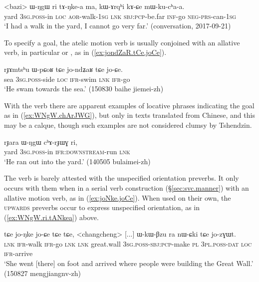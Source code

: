 \begin{exe}
\ex \label{ex:WNgW.ri.tANkea}
\gll <bazi> ɯ-ŋgɯ ri tɤ-ŋke-a ma, kɯ-ɤrqʰi kɤ-ɕe mɯ-ku-cʰa-a. \\
yard \textsc{3sg}.\textsc{poss}-in \textsc{loc} \textsc{aor}-walk-\textsc{1sg} \textsc{lnk} \textsc{sbj}:\textsc{pcp}-be.far \textsc{inf}-go \textsc{neg}-\textsc{prs}-can-\textsc{1sg} \\
\glt `I had a walk in the yard, I cannot go very far.' (conversation, 2017-09-21)
\end{exe}

To specify a goal, the atelic motion verb is usually conjoined with an allative verb, in particular  or , as in (\ref{ex:jondZaR.tCe.joCe}).

\begin{exe}
\ex \label{ex:jondZaR.tCe.joCe}
\gll rɟɤmtsʰu ɯ-pɕoʁ tɕe jo-ndʑaʁ tɕe jo-ɕe. \\
sea \textsc{3sg}.\textsc{poss}-side \textsc{loc} \textsc{ifr}-swim \textsc{lnk} \textsc{ifr}-go \\
\glt `He swam towards the sea.' (150830 baihe jiemei-zh)
\end{exe}

With the verb  there are apparent examples of locative phrases indicating the goal as in (\ref{ex:WNgW.chArJWG}), but only in texts translated from Chinese, and this may be a calque, though such examples are not considered clumsy by Tshendzin.

\begin{exe}
\ex \label{ex:WNgW.chArJWG}
\gll  rɟara ɯ-ŋgɯ cʰɤ-rɟɯɣ ri, \\
yard \textsc{3sg}.\textsc{poss}-in \textsc{ifr}:\textsc{downstream}-run \textsc{lnk} \\
\glt `He ran out into the yard.' (140505 bulaimei-zh) 
\end{exe} 

The verb  is barely attested with the unspecified orientation preverbs. It only occurs with them when in a serial verb construction (§\ref{sec:svc.manner}) with an allative motion verb, as in (\ref{ex:joNke.joCe}). When used on their own, the \textsc{upwards} preverbs occur to express unspecified orientation, as in (\ref{ex:WNgW.ri.tANkea}) above.

\begin{exe}
\ex \label{ex:joNke.joCe}
\gll tɕe jo-ŋke jo-ɕe tɕe tɕe, <changcheng> [...] ɯ-kɯ-βzu ra nɯ-ɕki tɕe jo-zɣɯt. \\
\textsc{lnk} \textsc{ifr}-walk \textsc{ifr}-go \textsc{lnk} \textsc{lnk} great.wall {  } \textsc{3sg}.\textsc{poss}-\textsc{sbj}:\textsc{pcp}-make \textsc{pl} \textsc{3pl}.\textsc{poss}-\textsc{dat} \textsc{loc} \textsc{ifr}-arrive \\
\glt `She went [there] on foot and arrived where people were building the Great Wall.' (150827 mengjiangnv-zh) 
\end{exe}

